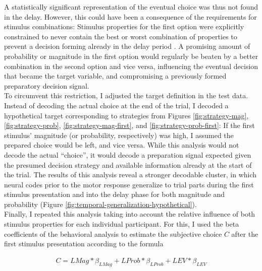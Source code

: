 A statistically significant representation of the eventual choice was thus not found in the delay.
However, this could have been a consequence of the requirements for stimulus combinations:
Stimulus properties for the first option were explicitly constrained to never contain the best or worst combination of properties to prevent a decision forming already in the delay period \citep{curtis2010beyond}.
A promising amount of probability or magnitude in the first option would regularly be beaten by a better combination in the second option and vice versa, influencing the eventual decision that became the target variable, and compromising a previously formed preparatory decision signal.\\
To circumvent this restriction, I adjusted the target definition in the test data.
Instead of decoding the actual choice at the end of the trial, I decoded a hypothetical target corresponding to strategies from Figures \ref{fig:strategy-mag}, \ref{fig:strategy-prob}, \ref{fig:strategy-mag-first}, and \ref{fig:strategy-prob-first}:
If the first stimulus' magnitude (or probability, respectively) was high, I assumed the prepared choice would be left, and vice versa.
While this analysis would not decode the actual ``choice'', it would decode a preparation signal expected given the presumed decision strategy and available information already at the start of the trial.
The results of this analysis reveal a stronger decodable cluster, in which neural codes prior to the motor response generalize to trial parts during the first stimulus presentation and into the delay phase for both magnitude and probability (Figure \ref{fig:temporal-generalization-hypothetical}). \\
Finally, I repeated this analysis taking into account the relative influence of both stimulus properties for each individual participant.
For this, I used the beta coefficients of the behavioral analysis to estimate the subjective choice $C$ after the first stimulus presentation according to the formula

\begin{equation}
	\begin{aligned}
	C = LMag * \beta_{LMag} + LProb * \beta_{LProb} + LEV * \beta_{LEV}
	\end{aligned}
\end{equation}

